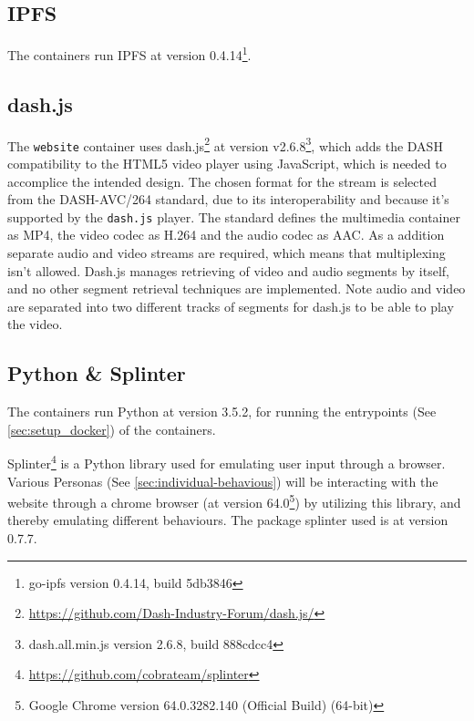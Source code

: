\subsection{IPFS}
\label{sec:setup_ipfs}
The containers run \ac{IPFS} at version 0.4.14\footnote{go-ipfs version 0.4.14, build 5db3846}.


\subsection{dash.js}
\label{sec:setup_dash.js}
The \texttt{website} container uses dash.js\footnote{\url{https://github.com/Dash-Industry-Forum/dash.js/}} at version v2.6.8\footnote{dash.all.min.js version 2.6.8, build 888cdcc4}, which adds the \ac{DASH} compatibility to the \ac{HTML}5 video player using JavaScript, which is needed to accomplice the intended design.
The chosen format for the stream is selected from the DASH-AVC/264 standard\cite{dash264}, due to its interoperability and because it's supported by the \texttt{dash.js} player.
The standard defines the multimedia container as MP4, the video codec as H.264 and the audio codec as AAC. As a addition separate audio and video streams are required, which means that multiplexing isn't allowed.
Dash.js manages retrieving of video and audio segments by itself, and no other segment retrieval techniques are implemented. Note audio and video are separated into two different tracks of segments for dash.js to be able to play the video.

\subsection{Python \& Splinter}
\label{sec:setup_python}
\label{sec:setup_splinter}
The containers run Python at version 3.5.2, for running the entrypoints (See \autoref{sec:setup_docker}) of the containers.

Splinter\footnote{\url{https://github.com/cobrateam/splinter}} is a Python library used for emulating user input through a browser. Various Personas (See \autoref{sec:individual-behavious}) will be interacting with the website through a chrome browser (at version 64.0\footnote{Google Chrome version 64.0.3282.140 (Official Build) (64-bit)}) by utilizing this library, and thereby emulating different behaviours.
The package splinter used is at version 0.7.7.


